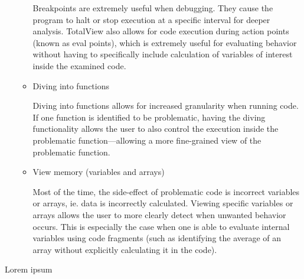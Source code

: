 \documentclass{article}
\begin{document}
\begin{enumerate}
\begin{itemize}
	Breakpoints are extremely useful when debugging. They cause the program to halt or stop execution at a specific interval for deeper analysis. TotalView also allows for code execution during action points (known as eval points), which is extremely useful for evaluating behavior without having to specifically include calculation of variables of interest inside the examined code. 
	\item Diving into functions
	
	Diving into functions allows for increased granularity when running code. If one function is identified to be problematic, having the diving functionality allows the user to also control the execution inside the problematic function---allowing a more fine-grained view of the problematic function.	
	\item View memory (variables and arrays)
	
	Most of the time, the side-effect of problematic code is incorrect variables or arrays, ie. data is incorrectly calculated. Viewing specific variables or arrays allows the user to more clearly detect when unwanted behavior occurs. This is especially the case when one is able to evaluate internal variables using code fragments (such as identifying the average of an array without explicitly calculating it in the code).

	\end{itemize}

\end{enumerate}


Lorem ipsum
\end{document}

